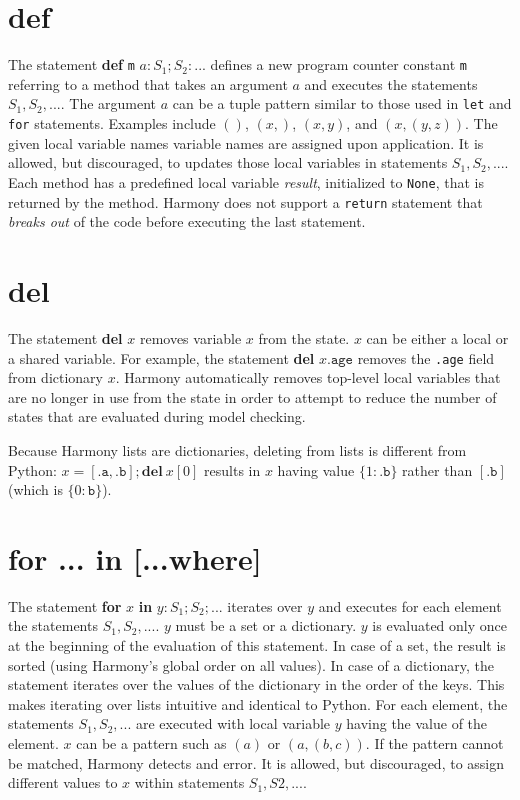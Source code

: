 \documentclass{report}
\begin{document}
\section{\textbf{def}}

The statement \textbf{def} \texttt{m} $a: S_1; S_2: ...$
defines a new program counter constant \texttt{m} referring to
a method that takes an argument $a$ and executes the statements
$S_1, S_2, ...$.  The argument $a$ can be a tuple pattern similar
to those used in \texttt{let} and \texttt{for} statements.
Examples include $()$, $(x,)$, $(x, y)$, and $(x, (y, z))$.
The given local variable names variable names are assigned
upon application.
It is allowed, but discouraged, to updates those local variables
in statements $S_1, S_2, ...$.
Each method has a predefined local variable
\textit{result}, initialized to \texttt{None},
that is returned by the method.  Harmony does
not support a \texttt{return} statement that \emph{breaks out}
of the code before executing the last statement.

\section{\textbf{del}}

The statement \textbf{del} $x$ removes variable $x$ from the
state.  $x$ can be either a local or a shared variable.  For
example, the statement \textbf{del} $x.\texttt{age}$ removes
the \texttt{.age} field from dictionary $x$.
Harmony automatically removes top-level local variables that
are no longer in use
from the state in order to attempt to reduce the number of states
that are evaluated during model checking.

Because Harmony lists are dictionaries, deleting from lists is different
from Python:
$x = [\mathtt{.a}, \mathtt{.b}]; \mathbf{del}~x[0]$ results in $x$ having value
$\{1: \mathtt{.b}\}$ rather than $[\mathtt{.b}]$ (which is $\{0: \mathtt{b}\}$).

\section{\textbf{for ... in [...where]}}

The statement \textbf{for} $x$ \textbf{in} $y: S_1; S_2; ...$
iterates over $y$ and executes for each element the statements
$S_1, S_2, ...$.
$y$ must be a set or a dictionary.  $y$ is evaluated only once at
the beginning of the evaluation of this statement.  In case of a set,
the result is sorted (using Harmony's global order on all values).
In case of a dictionary, the statement iterates over the values of
the dictionary in the order of the keys.  This makes iterating over
lists intuitive and identical to Python.
For each element, the statements $S_1, S_2, ...$ are executed with
local variable $y$ having the value of the element.
$x$ can be a pattern such as $(a)$ or $(a, (b, c))$.
If the pattern cannot be matched, Harmony detects and error.
It is allowed, but discouraged, to assign different values to $x$
within statements $S_1, S2, ...$.
\end{document}
